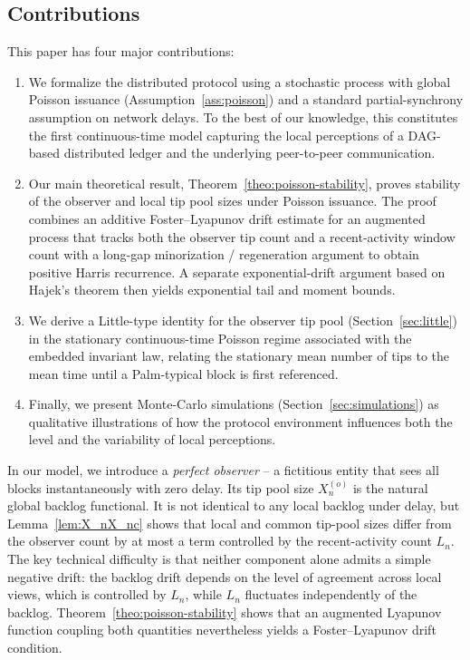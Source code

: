 \documentclass[a4paper,12pt,oneside,reqno]{amsart}
\newcommand{\1}{{\mathbf 1}}
\begin{document}
\subsection{Contributions}
This paper has four major contributions:
\begin{enumerate}
    \item We formalize the distributed protocol using a stochastic process with global Poisson issuance (Assumption~\ref{ass:poisson}) and a standard partial-synchrony assumption on network delays. To the best of our knowledge, this constitutes the first continuous-time model capturing the local perceptions of a DAG-based distributed ledger and the underlying peer-to-peer communication.
    \item Our main theoretical result, Theorem~\ref{theo:poisson-stability}, proves stability of the observer and local tip pool sizes under Poisson issuance. The proof combines an additive Foster--Lyapunov drift estimate for an augmented process that tracks both the observer tip count and a recent-activity window count with a long-gap minorization / regeneration argument to obtain positive Harris recurrence. A separate exponential-drift argument based on Hajek's theorem then yields exponential tail and moment bounds.
    \item We derive a Little-type identity for the observer tip pool (Section~\ref{sec:little}) in the stationary continuous-time Poisson regime associated with the embedded invariant law, relating the stationary mean number of tips to the mean time until a Palm-typical block is first referenced.
    \item Finally, we present Monte-Carlo simulations (Section~\ref{sec:simulations}) as qualitative illustrations of how the protocol environment influences both the level and the variability of local perceptions.
\end{enumerate}

\medskip
In our model, we introduce a \emph{perfect observer} -- a fictitious entity that sees all blocks instantaneously with zero delay. Its tip pool size $X_n^{(o)}$ is the natural global backlog functional. It is not identical to any local backlog under delay, but Lemma~\ref{lem:X_nX_nc} shows that local and common tip-pool sizes differ from the observer count by at most a term controlled by the recent-activity count $L_n$. The key technical difficulty is that neither component alone admits a simple negative drift: the backlog drift depends on the level of agreement across local views, which is controlled by $L_n$, while $L_n$ fluctuates independently of the backlog. Theorem~\ref{theo:poisson-stability} shows that an augmented Lyapunov function coupling both quantities nevertheless yields a Foster--Lyapunov drift condition.
\end{document}

